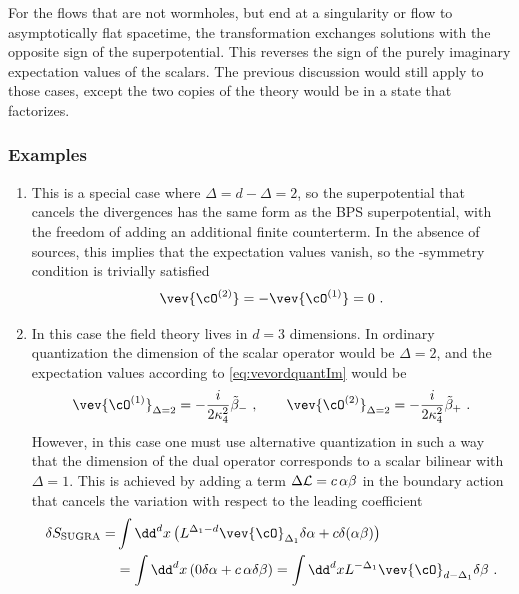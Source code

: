 For the flows that are not wormholes, but end at a singularity or flow to asymptotically flat spacetime, the \PT transformation exchanges solutions with the opposite sign of the superpotential. This reverses the sign of the purely imaginary expectation values of the scalars. The previous discussion would still apply to those cases, except the two copies of the theory would be in a state that factorizes.

\subsubsection{Examples}

\begin{enumerate}
	\item This is a special case where $\Delta=d-\Delta=2$, so the superpotential that cancels the divergences has the same form as the BPS superpotential, with the freedom of adding an additional finite counterterm. In the absence of sources, this implies that the expectation values vanish, so the \PT-symmetry condition is trivially satisfied 
	\begin{equation}     
	\vev{\cO^{(2)}}=-\vev{\cO^{(1)}}=0\ .
	\end{equation}
	\item In this case the field theory lives in $d=3$ dimensions. In ordinary quantization the dimension of the scalar operator would be $\Delta=2$, and the expectation values according to \eqref{eq:vevordquantIm} would be
\begin{equation}
	\vev{\cO^{(1)}}_{\Delta=2}=-\frac{i}{2\kappa_4^2} \tilde\beta_-
	\ ,\qquad
	\vev{\cO^{(2)}}_{\Delta=2}=-\frac{i}{2\kappa_4^2} \tilde\beta_+\ .
\end{equation}
However, in this case one must use alternative quantization in such a way that the dimension of the dual operator corresponds to a scalar bilinear with $\Delta=1$. This is achieved by adding a term  $\Delta {\cal L}=c\,\alpha \beta$ in the boundary action that cancels the variation with respect to the leading coefficient
\begin{equation}
\begin{split}
	\delta S_{\text{SUGRA}}=&\int \dd^dx\left(L^{\Delta_1-d}\vev{\cO}_{\Delta_1}\delta \alpha+c\delta(\alpha \beta)\right)\\
	&=\int \dd^d x\left(0 \delta \alpha+c\,\alpha\delta \beta\right)=\int \dd^d x L^{-\Delta_1}\vev{\cO}_{d-\Delta_1}\delta \beta\ .
\end{split}
\end{equation}

\end{enumerate}
